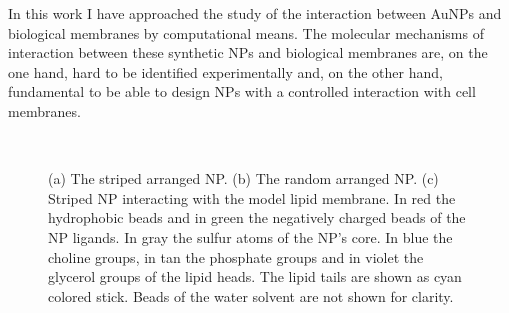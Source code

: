 In this work I have approached the study of the interaction between \acp{AuNP} and biological membranes by computational means. The molecular mechanisms of interaction between these synthetic \acp{NP} and biological membranes are, on the one hand, hard to be identified experimentally and, on the other hand, fundamental to be able to design \acp{NP} with a controlled interaction with cell membranes.
\begin{figure}[!ht]
	\center
	\qquad\qquad%
	\\%
	\caption{(a) The striped arranged \acs{NP}. (b) The random arranged \acs{NP}. (c) Striped \acs{NP} interacting with the model lipid membrane. In red the hydrophobic beads and in green the negatively charged beads of the \acs{NP} ligands. In gray the sulfur atoms of the \acs{NP}'s core. In blue the choline groups, in tan the phosphate groups and in violet the glycerol groups of the lipid heads. The lipid tails are shown as cyan colored stick. Beads of the water solvent are not shown for clarity.}
	\label{fig:NPSummary}
\end{figure}

